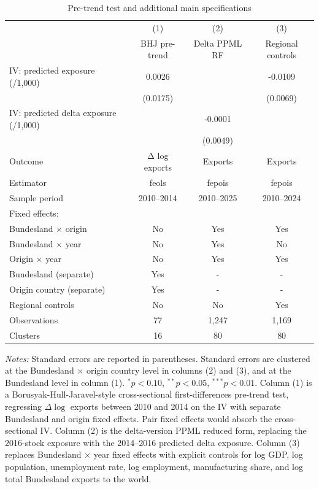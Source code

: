 \begin{table}[!htbp]
\centering
\caption{Pre-trend test and additional main specifications}
\label{tab:main_diagnostics_robustness}
\small
\begin{tabular}{lccc}
\toprule
 & (1) & (2) & (3) \\
 & BHJ pre-trend & Delta PPML RF & Regional controls \\
\midrule
IV: predicted exposure (/1,000) & 0.0026 &  & -0.0109 \\
 & (0.0175) &  & (0.0069) \\
IV: predicted delta exposure (/1,000) &  & -0.0001 &  \\
 &  & (0.0049) &  \\
\midrule
Outcome & Δ log exports & Exports & Exports \\
Estimator & feols & fepois & fepois \\
Sample period & 2010–2014 & 2010–2025 & 2010–2024 \\
\midrule
Fixed effects: &  &  &  \\
  Bundesland × origin & No & Yes & Yes \\
  Bundesland × year & No & Yes & No \\
  Origin × year & No & Yes & Yes \\
  Bundesland (separate) & Yes & - & - \\
  Origin country (separate) & Yes & - & - \\
Regional controls & No & No & Yes \\
\midrule
Observations & 77 & 1,247 & 1,169 \\
Clusters & 16 & 80 & 80 \\
\bottomrule
\end{tabular}
\begin{minipage}{0.95\textwidth}
\vspace{0.2cm}
\footnotesize
\textit{Notes:} Standard errors are reported in parentheses. Standard errors are clustered at the Bundesland $\times$ origin country level in columns (2) and (3), and at the Bundesland level in column (1). $^{*}p<0.10$, $^{**}p<0.05$, $^{***}p<0.01$. Column (1) is a Borusyak-Hull-Jaravel-style cross-sectional first-differences pre-trend test, regressing $\Delta \log$ exports between 2010 and 2014 on the IV with separate Bundesland and origin fixed effects. Pair fixed effects would absorb the cross-sectional IV. Column (2) is the delta-version PPML reduced form, replacing the 2016-stock exposure with the 2014--2016 predicted delta exposure. Column (3) replaces Bundesland $\times$ year fixed effects with explicit controls for log GDP, log population, unemployment rate, log employment, manufacturing share, and log total Bundesland exports to the world.
\end{minipage}
\end{table}
